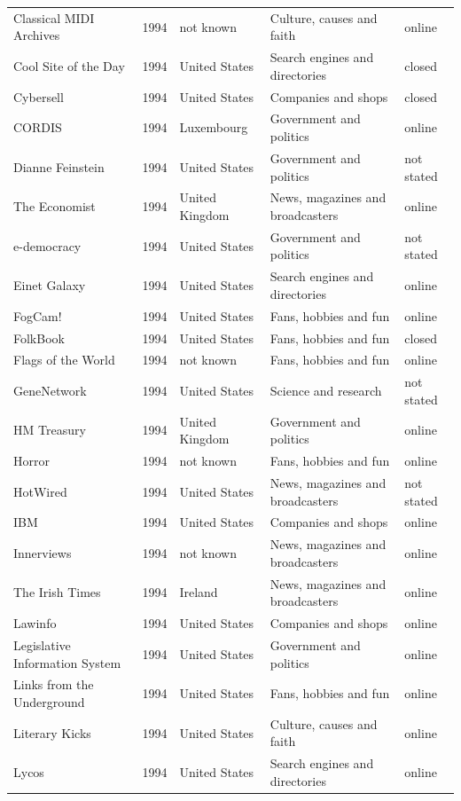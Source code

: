 \documentclass[11pt,a4paper]{article}
\begin{document}
\begin{footnotesize}
\begin{longtable}{p{4.6cm}rp{2.8cm}p{4.3cm}l}
Classical MIDI Archives & 1994 & not known & Culture, causes and faith & online\\
Cool Site of the Day & 1994 & United States & Search engines and directories & closed\\
Cybersell & 1994 & United States & Companies and shops & closed\\
CORDIS & 1994 & Luxembourg & Government and politics & online\\
Dianne Feinstein & 1994 & United States & Government and politics & not stated\\
The Economist & 1994 & United Kingdom & News, magazines and broadcasters & online\\
e-democracy & 1994 & United States & Government and politics & not stated\\
Einet Galaxy & 1994 & United States & Search engines and directories & online\\
FogCam! & 1994 & United States & Fans, hobbies and fun & online\\
FolkBook & 1994 & United States & Fans, hobbies and fun & closed\\
Flags of the World & 1994 & not known & Fans, hobbies and fun & online\\
GeneNetwork & 1994 & United States & Science and research & not stated\\
HM Treasury & 1994 & United Kingdom & Government and politics & online\\
Horror & 1994 & not known & Fans, hobbies and fun & online\\
HotWired & 1994 & United States & News, magazines and broadcasters & not stated\\
IBM & 1994 & United States & Companies and shops & online\\
Innerviews & 1994 & not known & News, magazines and broadcasters & online\\
The Irish Times & 1994 & Ireland & News, magazines and broadcasters & online\\
Lawinfo & 1994 & United States & Companies and shops & online\\
Legislative Information System & 1994 & United States & Government and politics & online\\
Links from the Underground & 1994 & United States & Fans, hobbies and fun & online\\
Literary Kicks & 1994 & United States & Culture, causes and faith & online\\
Lycos & 1994 & United States & Search engines and directories & online\\

\end{longtable}
\end{footnotesize}
\end{document}
